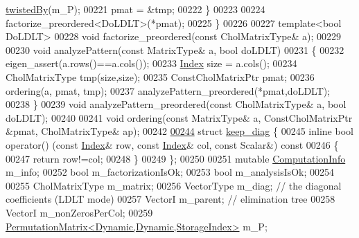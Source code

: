\begin{DoxyCode}
      \hyperlink{group___sparse_core___module_a51d4898bd6a57cc3ba543a39b102423e}{twistedBy}(m\_P);
00221         pmat = &tmp;
00222       \}
00223       
00224       factorize\_preordered<DoLDLT>(*pmat);
00225     \}
00226 
00227     \textcolor{keyword}{template}<\textcolor{keywordtype}{bool} DoLDLT>
00228     \textcolor{keywordtype}{void} factorize\_preordered(\textcolor{keyword}{const} CholMatrixType& a);
00229 
00230     \textcolor{keywordtype}{void} analyzePattern(\textcolor{keyword}{const} MatrixType& a, \textcolor{keywordtype}{bool} doLDLT)
00231     \{
00232       eigen\_assert(a.rows()==a.cols());
00233       \hyperlink{namespace_eigen_a62e77e0933482dafde8fe197d9a2cfde}{Index} size = a.cols();
00234       CholMatrixType tmp(size,size);
00235       ConstCholMatrixPtr pmat;
00236       ordering(a, pmat, tmp);
00237       analyzePattern\_preordered(*pmat,doLDLT);
00238     \}
00239     \textcolor{keywordtype}{void} analyzePattern\_preordered(\textcolor{keyword}{const} CholMatrixType& a, \textcolor{keywordtype}{bool} doLDLT);
00240     
00241     \textcolor{keywordtype}{void} ordering(\textcolor{keyword}{const} MatrixType& a, ConstCholMatrixPtr &pmat, CholMatrixType& ap);
00242 
\hyperlink{struct_eigen_1_1_simplicial_cholesky_base_1_1keep__diag}{00244}     \textcolor{keyword}{struct }\hyperlink{struct_eigen_1_1_simplicial_cholesky_base_1_1keep__diag}{keep\_diag} \{
00245       \textcolor{keyword}{inline} \textcolor{keywordtype}{bool} operator() (\textcolor{keyword}{const} \hyperlink{namespace_eigen_a62e77e0933482dafde8fe197d9a2cfde}{Index}& row, \textcolor{keyword}{const} \hyperlink{namespace_eigen_a62e77e0933482dafde8fe197d9a2cfde}{Index}& col, \textcolor{keyword}{const} Scalar&)\textcolor{keyword}{ const}
00246 \textcolor{keyword}{      }\{
00247         \textcolor{keywordflow}{return} row!=col;
00248       \}
00249     \};
00250 
00251     \textcolor{keyword}{mutable} \hyperlink{group__enums_ga85fad7b87587764e5cf6b513a9e0ee5e}{ComputationInfo} m\_info;
00252     \textcolor{keywordtype}{bool} m\_factorizationIsOk;
00253     \textcolor{keywordtype}{bool} m\_analysisIsOk;
00254     
00255     CholMatrixType m\_matrix;
00256     VectorType m\_diag;                                \textcolor{comment}{// the diagonal coefficients (LDLT mode)}
00257     VectorI m\_parent;                                 \textcolor{comment}{// elimination tree}
00258     VectorI m\_nonZerosPerCol;
00259     \hyperlink{group___core___module}{PermutationMatrix<Dynamic,Dynamic,StorageIndex>} m\_P;    

\end{DoxyCode}
